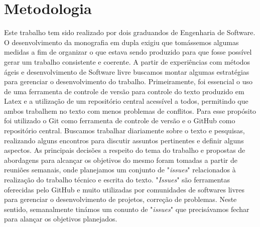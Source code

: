 \section{Metodologia}
\label{sec:methodology}

Este trabalho tem sido realizado por dois graduandos de Engenharia de Software.
%
O desenvolvimento da monografia em dupla exigiu que tomássemos algumas medidas a fim de organizar o que estava sendo produzido para que fosse possível gerar um trabalho consistente e coerente. A partir de experiências com métodos ágeis e desenvolvimento de Software livre buscamos montar algumas estratégias para gerenciar o desenvolvimento do trabalho. Primeiramente, foi essencial o uso de uma ferramenta de controle de versão para controle do texto produzido em Latex e a utilização de um repositório central acessível a todos, permitindo que ambos trabalhem no texto com menos problemas de conflitos. Para esse propósito foi utilizado o Git como ferramenta de controle de versão e o GitHub como repositório central. Buscamos trabalhar diariamente sobre o texto e pesquisas, realizando alguns encontros para discutir assuntos pertinentes e definir alguns aspectos. As principais decisões a respeito do tema do trabalho e propostas de abordagens para alcançar os objetivos do mesmo foram tomadas a partir de reuniões semanais, onde planejamos um conjunto de "\emph{issues}" relacionados à realização do trabalho técnico e escrita do texto. "\emph{Issues}" são ferramentas oferecidas pelo GitHub e muito utilizadas por comunidades de softwares livres para gerenciar o desenvolvimento de projetos, correção de problemas. Neste sentido, semanalmente tinámos um conunto de "\emph{issues}" que precisávamos fechar para alançar os objetivos planejados.
